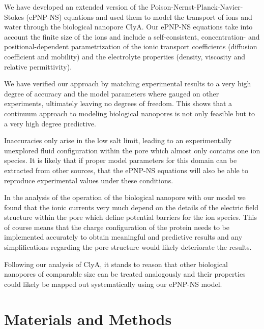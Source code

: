 \documentclass[journal=ancac3,manuscript=article,etalmode=truncate,maxauthors=0,layout=onecolumn]{achemso}
\begin{document}
We have developed an extended version of the Poison-Nernst-Planck-Navier-Stokes (ePNP-NS) equations and used
them to model the transport of ions and water through the biological nanopore ClyA. Our ePNP-NS equations take
into account the finite size of the ions and include a self-consistent, concentration- and
positional-dependent parametrization of the ionic transport coefficients (diffusion coefficient and mobility)
and the electrolyte properties (density, viscosity and relative permittivity).

We have verified our approach by matching experimental results to a very high degree of accuracy and the
model parameters where gauged on other experiments, ultimately leaving no degrees of freedom. This shows that
a continuum approach to modeling biological nanopores is not only feasible but to a very high degree
predictive.

Inaccuracies only arise in the low salt limit, leading to an experimentally unexplored fluid configuration
within the pore which almost only contains one ion species. It is likely that if proper model parameters for
this domain can be extracted from other sources, that the ePNP-NS equations will also be able to reproduce
experimental values under these conditions.

In the analysis of the operation of the biological nanopore with our model we found that the ionic currents
very much depend on the details of the electric field structure within the pore which define potential
barriers for the ion species. This of course means that the charge configuration of the protein needs to be
implemented accurately to obtain meaningful and predictive results and any simplifications regarding the pore
structure would likely deteriorate the results.

Following our analysis of ClyA, it stands to reason that other biological nanopores of comparable size can be
treated analogously and their properties could likely be mapped out systematically using our ePNP-NS model.


\section{Materials and Methods}\label{sec:methods}
\end{document}
